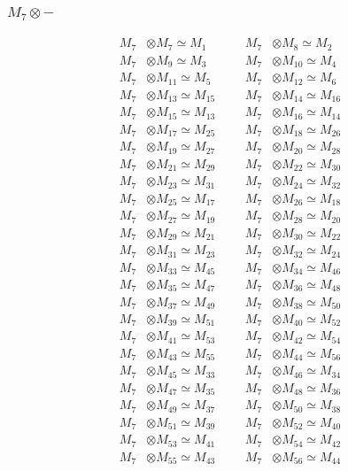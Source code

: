 \subsubsection{$ M_{7}\otimes -$}
\begin{align*}
M_{7} &\otimes M_{7} \simeq M_{1} &&& M_{7} &\otimes M_{8} \simeq M_{2}\\
M_{7} &\otimes M_{9} \simeq M_{3} &&& M_{7} &\otimes M_{10} \simeq M_{4}\\
M_{7} &\otimes M_{11} \simeq M_{5} &&& M_{7} &\otimes M_{12} \simeq M_{6}\\
M_{7} &\otimes M_{13} \simeq M_{15} &&& M_{7} &\otimes M_{14} \simeq M_{16}\\
M_{7} &\otimes M_{15} \simeq M_{13} &&& M_{7} &\otimes M_{16} \simeq M_{14}\\
M_{7} &\otimes M_{17} \simeq M_{25} &&& M_{7} &\otimes M_{18} \simeq M_{26}\\
M_{7} &\otimes M_{19} \simeq M_{27} &&& M_{7} &\otimes M_{20} \simeq M_{28}\\
M_{7} &\otimes M_{21} \simeq M_{29} &&& M_{7} &\otimes M_{22} \simeq M_{30}\\
M_{7} &\otimes M_{23} \simeq M_{31} &&& M_{7} &\otimes M_{24} \simeq M_{32}\\
M_{7} &\otimes M_{25} \simeq M_{17} &&& M_{7} &\otimes M_{26} \simeq M_{18}\\
M_{7} &\otimes M_{27} \simeq M_{19} &&& M_{7} &\otimes M_{28} \simeq M_{20}\\
M_{7} &\otimes M_{29} \simeq M_{21} &&& M_{7} &\otimes M_{30} \simeq M_{22}\\
M_{7} &\otimes M_{31} \simeq M_{23} &&& M_{7} &\otimes M_{32} \simeq M_{24}\\
M_{7} &\otimes M_{33} \simeq M_{45} &&& M_{7} &\otimes M_{34} \simeq M_{46}\\
M_{7} &\otimes M_{35} \simeq M_{47} &&& M_{7} &\otimes M_{36} \simeq M_{48}\\
M_{7} &\otimes M_{37} \simeq M_{49} &&& M_{7} &\otimes M_{38} \simeq M_{50}\\
M_{7} &\otimes M_{39} \simeq M_{51} &&& M_{7} &\otimes M_{40} \simeq M_{52}\\
M_{7} &\otimes M_{41} \simeq M_{53} &&& M_{7} &\otimes M_{42} \simeq M_{54}\\
M_{7} &\otimes M_{43} \simeq M_{55} &&& M_{7} &\otimes M_{44} \simeq M_{56}\\
M_{7} &\otimes M_{45} \simeq M_{33} &&& M_{7} &\otimes M_{46} \simeq M_{34}\\
M_{7} &\otimes M_{47} \simeq M_{35} &&& M_{7} &\otimes M_{48} \simeq M_{36}\\
M_{7} &\otimes M_{49} \simeq M_{37} &&& M_{7} &\otimes M_{50} \simeq M_{38}\\
M_{7} &\otimes M_{51} \simeq M_{39} &&& M_{7} &\otimes M_{52} \simeq M_{40}\\
M_{7} &\otimes M_{53} \simeq M_{41} &&& M_{7} &\otimes M_{54} \simeq M_{42}\\
M_{7} &\otimes M_{55} \simeq M_{43} &&& M_{7} &\otimes M_{56} \simeq M_{44}\\
\end{align*}

